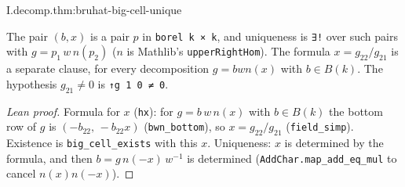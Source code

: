 \begin{theorem}
\end{theorem}
\begin{tfformal}{I.decomp.thm:bruhat-big-cell-unique}
\begin{tffidelity}
The pair $(b,x)$ is a pair $p$ in \texttt{borel k × k}, and uniqueness is \texttt{∃!} over such pairs with $g=p_1\,w\,n(p_2)$ ($n$ is Mathlib's \texttt{upperRightHom}). The formula $x=g_{22}/g_{21}$ is a separate clause, for every decomposition $g=bwn(x)$ with $b\in B(k)$. The hypothesis $g_{21}\ne0$ is \texttt{↑g 1 0 ≠ 0}.
\end{tffidelity}
\end{tfformal}
\begin{proof}[Lean proof]
Formula for $x$ (\texttt{hx}): for $g=b\,w\,n(x)$ with $b\in B(k)$ the bottom row of $g$ is $(-b_{22},\,-b_{22}x)$ (\texttt{bwn\_bottom}), so $x=g_{22}/g_{21}$ (\texttt{field\_simp}). Existence is \texttt{big\_cell\_exists} with this $x$. Uniqueness: $x$ is determined by the formula, and then $b=g\,n(-x)\,w^{-1}$ is determined (\texttt{AddChar.map\_add\_eq\_mul} to cancel $n(x)n(-x)$).
\end{proof}

